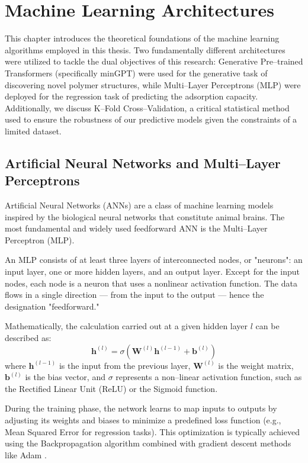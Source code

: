 \chapter{Machine Learning Architectures}

This chapter introduces the theoretical foundations of the machine learning algorithms employed in this thesis. Two fundamentally different architectures were utilized to tackle the dual objectives of this research: Generative Pre--trained Transformers (specifically minGPT) were used for the generative task of discovering novel polymer structures, while Multi--Layer Perceptrons (MLP) were deployed for the regression task of predicting the adsorption capacity. Additionally, we discuss K--Fold Cross--Validation, a critical statistical method used to ensure the robustness of our predictive models given the constraints of a limited dataset.

\section{Artificial Neural Networks and Multi--Layer Perceptrons}
\label{sec:mlp}

Artificial Neural Networks (ANNs) are a class of machine learning models inspired by the biological neural networks that constitute animal brains. The most fundamental and widely used feedforward ANN is the Multi--Layer Perceptron (MLP).

An MLP consists of at least three layers of interconnected nodes, or "neurons": an input layer, one or more hidden layers, and an output layer.  Except for the input nodes, each node is a neuron that uses a nonlinear activation function. The data flows in a single direction — from the input to the output — hence the designation "feedforward."

Mathematically, the calculation carried out at a given hidden layer $l$ can be described as:
\begin{equation}
	\mathbf{h}^{(l)} = \sigma \left( \mathbf{W}^{(l)} \mathbf{h}^{(l-1)} + \mathbf{b}^{(l)} \right)
\end{equation}
where $\mathbf{h}^{(l-1)}$ is the input from the previous layer, $\mathbf{W}^{(l)}$ is the weight matrix, $\mathbf{b}^{(l)}$ is the bias vector, and $\sigma$ represents a non--linear activation function, such as the Rectified Linear Unit (ReLU) or the Sigmoid function.

During the training phase, the network learns to map inputs to outputs by adjusting its weights and biases to minimize a predefined loss function (e.g., Mean Squared Error for regression tasks). This optimization is typically achieved using the Backpropagation algorithm combined with gradient descent methods like Adam \cite{kingma2014adam}.


